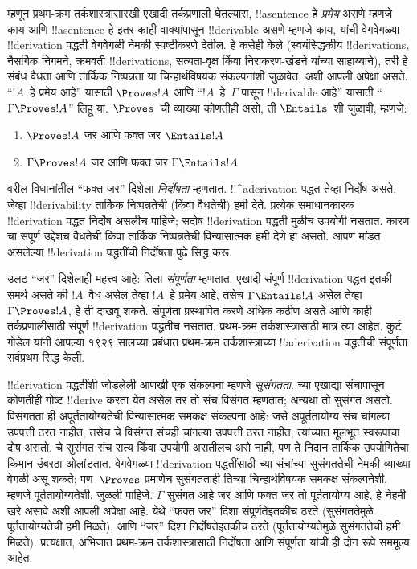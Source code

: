 \documentclass[../../../include/open-logic-section]{subfiles}
\begin{document}
म्हणून प्रथम-क्रम तर्कशास्त्रासारखी एखादी तर्कप्रणाली घेतल्यास,
!!a{sentence} हे \emph{प्रमेय} असणे म्हणजे काय आणि !!a{sentence} हे
इतर काही वाक्यांपासून !!{derivable} असणे म्हणजे काय, यांची
वेगवेगळ्या !!{derivation} पद्धती वेगवेगळी नेमकी स्पष्टीकरणे देतील. हे
कसेही केले (स्वयंसिद्धकीय !!{derivation}s, नैसर्गिक निगमने, क्रमवर्ती
!!{derivation}s, सत्यता-वृक्ष किंवा निराकरण-खंडने यांच्या साहाय्याने),
तरी हे संबंध वैधता आणि तार्किक निष्पन्नता या चिन्हार्थविषयक संकल्पनांशी
जुळावेत, अशी आपली अपेक्षा असते. ``$!A$~हे प्रमेय आहे'' यासाठी
$\Proves !A$ आणि ``$!A$~हे~$\Gamma$ पासून !!{derivable} आहे'' यासाठी
``$\Gamma \Proves !A$'' लिहू या. $\Proves$~ची व्याख्या कोणतीही असो,
ती $\Entails$~शी जुळावी, म्हणजे:
\begin{enumerate}
\item $\Proves !A$ जर आणि फक्त जर $\Entails !A$
\item $\Gamma \Proves !A$ जर आणि फक्त जर $\Gamma \Entails !A$
\end{enumerate}
वरील विधानांतील ``फक्त जर'' दिशेला \emph{निर्दोषता} म्हणतात.
!!^a{derivation} पद्धत तेव्हा निर्दोष असते, जेव्हा !!{derivability}
तार्किक निष्पन्नतेची (किंवा वैधतेची) हमी देते. प्रत्येक समाधानकारक
!!{derivation} पद्धत निर्दोष असलीच पाहिजे; सदोष !!{derivation} पद्धती
मुळीच उपयोगी नसतात. कारण चा संपूर्ण उद्देशच वैधतेची
किंवा तार्किक निष्पन्नतेची विन्यासात्मक हमी देणे हा असतो. आपण मांडत
असलेल्या !!{derivation} पद्धतींची निर्दोषता पुढे सिद्ध करू.

उलट ``जर'' दिशेलाही महत्त्व आहे: तिला \emph{संपूर्णता} म्हणतात.
एखादी संपूर्ण !!{derivation} पद्धत इतकी समर्थ असते की $!A$~वैध असेल
तेव्हा $!A$~हे प्रमेय आहे, तसेच $\Gamma \Entails !A$ असेल तेव्हा
$\Gamma \Proves !A$, हे ती दाखवू शकते. संपूर्णता प्रस्थापित करणे अधिक
कठीण असते आणि काही तर्कप्रणालींसाठी संपूर्ण !!{derivation} पद्धतीच
नसतात. प्रथम-क्रम तर्कशास्त्रासाठी मात्र त्या आहेत. कुर्ट गोडेल यांनी
आपल्या १९२९ सालच्या प्रबंधात प्रथम-क्रम तर्कशास्त्राच्या
!!a{derivation} पद्धतीची संपूर्णता सर्वप्रथम सिद्ध केली.

!!{derivation} पद्धतींशी जोडलेली आणखी एक संकल्पना म्हणजे
\emph{सुसंगतता}. च्या एखाद्या संचापासून कोणतीही गोष्ट
!!{derive} करता येत असेल तर तो संच विसंगत म्हणतात; अन्यथा तो सुसंगत
असतो. विसंगतता ही अपूर्ततायोग्यतेची विन्यासात्मक समकक्ष संकल्पना आहे:
जसे अपूर्ततायोग्य संच चांगल्या उपपत्ती ठरत नाहीत, तसेच चे
विसंगत संचही चांगल्या उपपत्ती ठरत नाहीत; त्यांच्यात मूलभूत स्वरूपाचा
दोष असतो. चे सुसंगत संच सत्य किंवा उपयोगी असतीलच असे
नाही, पण ते निदान तार्किक उपयोगितेचा किमान उंबरठा ओलांडतात. वेगवेगळ्या
!!{derivation} पद्धतींसाठी च्या संचांच्या सुसंगततेची नेमकी
व्याख्या वेगळी असू शकते; पण~$\Proves$ प्रमाणेच सुसंगतताही तिच्या
चिन्हार्थविषयक समकक्ष संकल्पनेशी, म्हणजे पूर्ततायोग्यतेशी, जुळली पाहिजे.
$\Gamma$ सुसंगत आहे जर आणि फक्त जर तो पूर्ततायोग्य आहे, हे नेहमी खरे
असावे अशी आपली अपेक्षा आहे. येथे ``फक्त जर'' दिशा संपूर्णतेइतकीच ठरते
(सुसंगततेमुळे पूर्ततायोग्यतेची हमी मिळते), आणि ``जर'' दिशा
निर्दोषतेइतकीच ठरते (पूर्ततायोग्यतेमुळे सुसंगततेची हमी मिळते).
प्रत्यक्षात, अभिजात प्रथम-क्रम तर्कशास्त्रासाठी निर्दोषता आणि संपूर्णता
यांची ही दोन रूपे सममूल्य आहेत.
\end{document}
